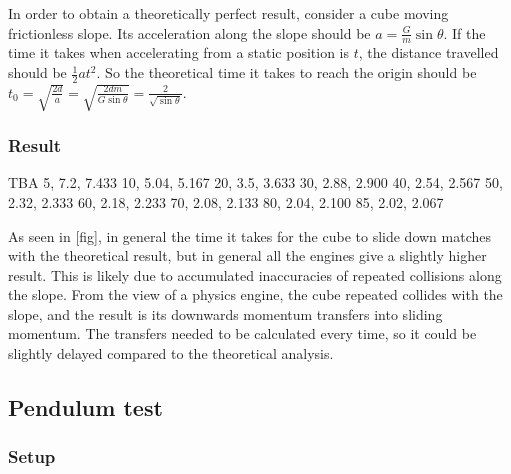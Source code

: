 \documentclass[12pt,a4paper,twoside,openright]{report}
\begin{document}
In order to obtain a theoretically perfect result, consider a cube moving frictionless slope. Its acceleration along the slope should be $a=\frac{G}{m}\sin \theta$. If the time it takes when accelerating from a static position is $t$, the distance travelled should be $\frac{1}{2}at^2$. So the theoretical time it takes to reach the origin should be $t_0=\sqrt{\frac{2d}{a}}=\sqrt{\frac{2dm}{G\sin \theta}}=\frac{2}{\sqrt{\sin\theta}}$.

\begin{center}
\end{center}

\subsubsection{Result}

TBA
5, 7.2, 7.433
10, 5.04, 5.167
20, 3.5, 3.633
30, 2.88, 2.900
40, 2.54, 2.567
50, 2.32, 2.333
60, 2.18, 2.233
70, 2.08, 2.133
80, 2.04, 2.100
85, 2.02, 2.067

As seen in [fig], in general the time it takes for the cube to slide down matches with the theoretical result, but in general all the engines give a slightly higher result. This is likely due to accumulated inaccuracies of repeated collisions along the slope. From the view of a physics engine, the cube repeated collides with the slope, and the result is its downwards momentum transfers into sliding momentum. The transfers needed to be calculated every time, so it could be slightly delayed compared to the theoretical analysis.

\subsection{Pendulum test}

\subsubsection{Setup}
\end{document}
